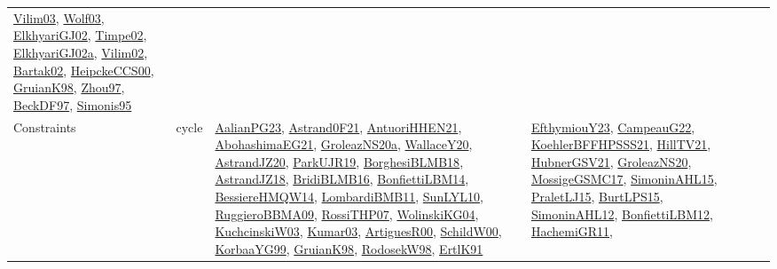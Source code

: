 {\begin{longtable}{lp{3cm}>{\raggedright}p{6cm}>{\raggedright}p{6cm}p{8cm}}
\href{papers/Vilim03.pdf}{Vilim03}\cite{Vilim03}, \href{papers/Wolf03.pdf}{Wolf03}\cite{Wolf03}, \href{papers/ElkhyariGJ02.pdf}{ElkhyariGJ02}\cite{ElkhyariGJ02}, \href{articles/Timpe02.pdf}{Timpe02}\cite{Timpe02}, \href{papers/ElkhyariGJ02a.pdf}{ElkhyariGJ02a}\cite{ElkhyariGJ02a}, \href{papers/Vilim02.pdf}{Vilim02}\cite{Vilim02}, \href{papers/Bartak02.pdf}{Bartak02}\cite{Bartak02}, \href{articles/HeipckeCCS00.pdf}{HeipckeCCS00}\cite{HeipckeCCS00}, \href{papers/GruianK98.pdf}{GruianK98}\cite{GruianK98}, \href{articles/Zhou97.pdf}{Zhou97}\cite{Zhou97}, \href{papers/BeckDF97.pdf}{BeckDF97}\cite{BeckDF97}, \href{papers/Simonis95.pdf}{Simonis95}\cite{Simonis95}\\
Constraints & cycle & \href{papers/AalianPG23.pdf}{AalianPG23}\cite{AalianPG23}, \href{papers/Astrand0F21.pdf}{Astrand0F21}\cite{Astrand0F21}, \href{papers/AntuoriHHEN21.pdf}{AntuoriHHEN21}\cite{AntuoriHHEN21}, \href{articles/AbohashimaEG21.pdf}{AbohashimaEG21}\cite{AbohashimaEG21}, \href{papers/GroleazNS20a.pdf}{GroleazNS20a}\cite{GroleazNS20a}, \href{articles/WallaceY20.pdf}{WallaceY20}\cite{WallaceY20}, \href{articles/AstrandJZ20.pdf}{AstrandJZ20}\cite{AstrandJZ20}, \href{papers/ParkUJR19.pdf}{ParkUJR19}\cite{ParkUJR19}, \href{articles/BorghesiBLMB18.pdf}{BorghesiBLMB18}\cite{BorghesiBLMB18}, \href{papers/AstrandJZ18.pdf}{AstrandJZ18}\cite{AstrandJZ18}, \href{articles/BridiBLMB16.pdf}{BridiBLMB16}\cite{BridiBLMB16}, \href{articles/BonfiettiLBM14.pdf}{BonfiettiLBM14}\cite{BonfiettiLBM14}, \href{papers/BessiereHMQW14.pdf}{BessiereHMQW14}\cite{BessiereHMQW14}, \href{papers/LombardiBMB11.pdf}{LombardiBMB11}\cite{LombardiBMB11}, \href{papers/SunLYL10.pdf}{SunLYL10}\cite{SunLYL10}, \href{articles/RuggieroBBMA09.pdf}{RuggieroBBMA09}\cite{RuggieroBBMA09}, \href{papers/RossiTHP07.pdf}{RossiTHP07}\cite{RossiTHP07}, \href{papers/WolinskiKG04.pdf}{WolinskiKG04}\cite{WolinskiKG04}, \href{articles/KuchcinskiW03.pdf}{KuchcinskiW03}\cite{KuchcinskiW03}, \href{papers/Kumar03.pdf}{Kumar03}\cite{Kumar03}, \href{articles/ArtiguesR00.pdf}{ArtiguesR00}\cite{ArtiguesR00}, \href{articles/SchildW00.pdf}{SchildW00}\cite{SchildW00}, \href{papers/KorbaaYG99.pdf}{KorbaaYG99}\cite{KorbaaYG99}, \href{papers/GruianK98.pdf}{GruianK98}\cite{GruianK98}, \href{papers/RodosekW98.pdf}{RodosekW98}\cite{RodosekW98}, \href{papers/ErtlK91.pdf}{ErtlK91}\cite{ErtlK91} & \href{papers/EfthymiouY23.pdf}{EfthymiouY23}\cite{EfthymiouY23}, \href{articles/CampeauG22.pdf}{CampeauG22}\cite{CampeauG22}, \href{articles/KoehlerBFFHPSSS21.pdf}{KoehlerBFFHPSSS21}\cite{KoehlerBFFHPSSS21}, \href{papers/HillTV21.pdf}{HillTV21}\cite{HillTV21}, \href{articles/HubnerGSV21.pdf}{HubnerGSV21}\cite{HubnerGSV21}, \href{papers/GroleazNS20.pdf}{GroleazNS20}\cite{GroleazNS20}, \href{papers/MossigeGSMC17.pdf}{MossigeGSMC17}\cite{MossigeGSMC17}, \href{articles/SimoninAHL15.pdf}{SimoninAHL15}\cite{SimoninAHL15}, \href{papers/PraletLJ15.pdf}{PraletLJ15}\cite{PraletLJ15}, \href{papers/BurtLPS15.pdf}{BurtLPS15}\cite{BurtLPS15}, \href{papers/SimoninAHL12.pdf}{SimoninAHL12}\cite{SimoninAHL12}, \href{papers/BonfiettiLBM12.pdf}{BonfiettiLBM12}\cite{BonfiettiLBM12}, \href{articles/HachemiGR11.pdf}{HachemiGR11}\cite{HachemiGR11}, 
\end{longtable}}
